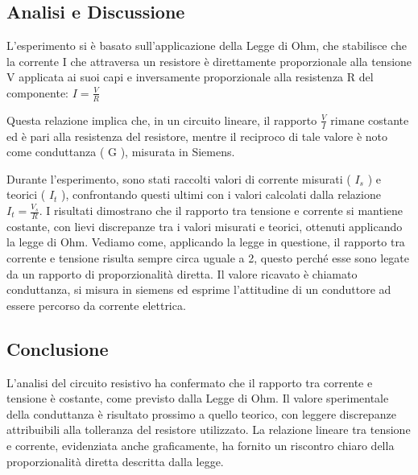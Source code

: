\subsection{Analisi e Discussione}
L’esperimento si è basato sull’applicazione della Legge di Ohm, che stabilisce che la corrente  I  che attraversa un resistore è direttamente proporzionale alla tensione  V  applicata ai suoi capi e inversamente proporzionale alla resistenza  R  del componente:
$I = \frac{V}{R}$

Questa relazione implica che, in un circuito lineare, il rapporto $\frac{V}{I}$ rimane costante ed è pari alla resistenza del resistore, mentre il reciproco di tale valore è noto come conduttanza ( G ), misurata in Siemens.

Durante l’esperimento, sono stati raccolti valori di corrente misurati ( $I_s$ ) e teorici ( $I_t$ ), confrontando questi ultimi con i valori calcolati dalla relazione  $I_t = \frac{V_s}{R}$. I risultati dimostrano che il rapporto tra tensione e corrente si mantiene costante, con lievi discrepanze tra i valori misurati e teorici, ottenuti applicando la legge di Ohm.
Vediamo come, applicando la legge in questione, il rapporto tra corrente e tensione risulta sempre circa uguale a 2, questo perché esse sono legate da un rapporto di proporzionalità diretta. Il valore ricavato è chiamato conduttanza, si misura in siemens ed esprime l’attitudine di un conduttore ad essere percorso da corrente elettrica.

\subsection{Conclusione}
L’analisi del circuito resistivo ha confermato che il rapporto tra corrente e tensione è costante, come previsto dalla Legge di Ohm. Il valore sperimentale della conduttanza è risultato prossimo a quello teorico, con leggere discrepanze attribuibili alla tolleranza del resistore utilizzato. La relazione lineare tra tensione e corrente, evidenziata anche graficamente, ha fornito un riscontro chiaro della proporzionalità diretta descritta dalla legge.

